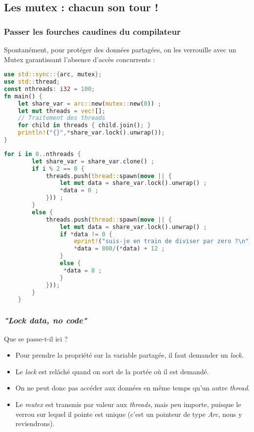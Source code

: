 \subsection{Les mutex : chacun son tour !}
\begin{frame}[fragile]
  \frametitle{Passer les fourches caudines du compilateur}
Spontanément, pour protéger des données partagées, on les verrouille avec un Mutex garantissant l'absence d'accès concurrents :
\begin{lstlisting}[language=rust, basicstyle=\tiny{}]
use std::sync::{arc, mutex};
use std::thread;
const nthreads: i32 = 100;
fn main() {
    let share_var = arc::new(mutex::new(0)) ;
    let mut threads = vec![];
    // Traitement des threads
    for child in threads { child.join(); }
    println!("{}",*share_var.lock().unwrap());
}
\end{lstlisting}
\end{frame}
\begin{frame}[fragile]
  \begin{lstlisting}[language=rust, basicstyle=\tiny{}]
    for i in 0..nthreads {
        let share_var = share_var.clone() ;
        if i % 2 == 0 {
            threads.push(thread::spawn(move || {
                let mut data = share_var.lock().unwrap() ;
                *data = 0 ;
            })) ;
        }
        else {
            threads.push(thread::spawn(move || {
                let mut data = share_var.lock().unwrap() ;
                if *data != 0 {
                    eprint!("suis-je en train de diviser par zero ?\n");
                    *data = 800/(*data) + 12 ;
                }
                else {
                 *data = 8 ;
                }
            }));
        }
    }
  \end{lstlisting}
\end{frame}
\begin{frame}[fragile]
  \frametitle{\textit{"Lock data, no code"}}
Que se passe-t-il ici ?
\begin{itemize}
\item Pour prendre la propriété sur la variable partagée, il faut demander un \textit{lock}.
\item Le \textit{lock} est relâché quand on sort de la portée où il est demandé.
\item On ne peut donc pas accéder aux données en même temps qu'un autre \textit{thread}.
\item Le \textit{mutex} est transmis par valeur aux \textit{threads}, mais peu importe, puisque le verrou sur lequel il pointe est unique (c'est un pointeur de type \textit{Arc}, nous y reviendrons).
\end{itemize}
\end{frame}
